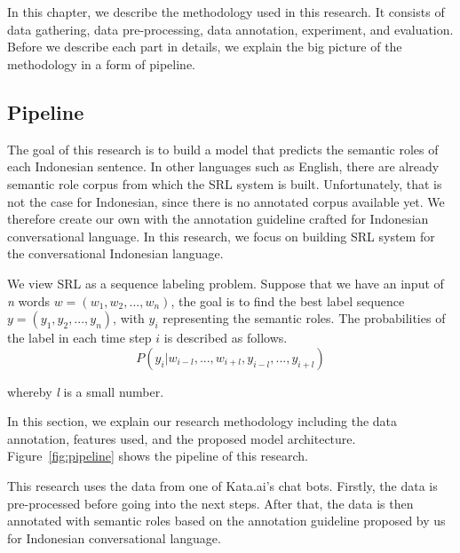 \chapter{\babTiga}\label{bab:tiga}
In this chapter, we describe the methodology used in this research. It consists of data gathering, data pre-processing, data annotation, experiment, and evaluation. Before we describe each part in details, we explain the big picture of the methodology in a form of pipeline.

\section{Pipeline}
The goal of this research is to build a model that predicts the semantic roles of each Indonesian sentence. In other languages such as English, there are already semantic role corpus from which the SRL system is built. Unfortunately, that is not the case for Indonesian, since there is no annotated corpus available yet. We therefore create our own with the annotation guideline crafted for Indonesian conversational language. In this research, we focus on building SRL system for the conversational Indonesian language. 

We view SRL as a sequence labeling problem. Suppose that we have an input of \textit{n} words $w = (w_{1}, w_{2}, ..., w_{n})$, the goal is to find the best label sequence $y = (y_{1}, y_{2}, ..., y_{n})$, with $y_{i}$ representing the semantic roles. The probabilities of the label in each time step $i$ is described as follows.
\begin{equation}
P(y_{i}|w_{i-l}, ..., w_{i+l},y_{i-l}, ..., y_{i+l})
\end{equation}

whereby \textit{l} is a small number. 

In this section, we explain our research methodology including the data annotation, features used, and the proposed model architecture. Figure~\ref{fig:pipeline} shows the pipeline of this research.

This research uses the data from one of Kata.ai's chat bots. Firstly, the data is pre-processed before going into the next steps. After that, the data is then annotated with semantic roles based on the annotation guideline proposed by us for Indonesian conversational language.

